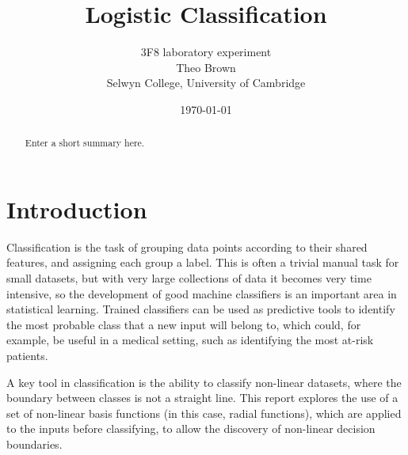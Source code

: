 \documentclass[a4paper]{article}
\begin{document}
    \title{Logistic Classification}
    \author{3F8 laboratory experiment \\ Theo Brown \\ Selwyn College, University of Cambridge}
    \date{\today}
    \maketitle

    \begin{abstract}
        Enter a short summary here.
    \end{abstract}

    \section{Introduction}\label{sec:introduction}
    Classification is the task of grouping data points according to their shared features, and assigning each group
    a label. This is often a trivial manual task for small datasets, but with very large collections of data it
    becomes very time intensive, so the development of good machine classifiers is an important area in statistical
    learning. Trained classifiers can be used as predictive tools to identify the most probable class that a new
    input will belong to, which could, for example, be useful in a medical setting, such as identifying the most
    at-risk patients.

    A key tool in classification is the ability to classify non-linear datasets, where the boundary between classes
    is not a straight line. This report explores the use of a set of non-linear basis functions (in this case,
    radial functions), which are applied to the inputs before classifying, to allow the discovery of non-linear
    decision boundaries.
\end{document}
